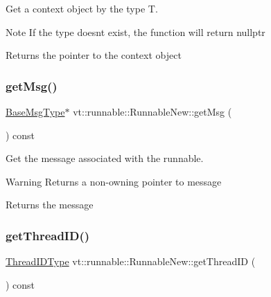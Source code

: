 Get a context object by the type {\ttfamily T}. 

\begin{DoxyNote}{Note}
If the type doesn\textquotesingle{}t exist, the function will return {\ttfamily nullptr} 
\end{DoxyNote}
\begin{DoxyReturn}{Returns}
the pointer to the context object 
\end{DoxyReturn}
\mbox{\label{structvt_1_1runnable_1_1_runnable_new_aed655dff826a821a3db9162259f33288}} 
\subsubsection{\texorpdfstring{get\+Msg()}{getMsg()}}
{\footnotesize\ttfamily \hyperlink{namespacevt_a44d0d4e144748f2b19a1cfd962f50338}{Base\+Msg\+Type}$\ast$ vt\+::runnable\+::\+Runnable\+New\+::get\+Msg (\begin{DoxyParamCaption}{ }\end{DoxyParamCaption}) const\hspace{0.3cm}{\ttfamily [inline]}}



Get the message associated with the runnable. 

\begin{DoxyWarning}{Warning}
Returns a non-\/owning pointer to message
\end{DoxyWarning}
\begin{DoxyReturn}{Returns}
the message 
\end{DoxyReturn}
\mbox{\label{structvt_1_1runnable_1_1_runnable_new_a42ab8351e2003e8810711ef020a72931}} 
\subsubsection{\texorpdfstring{get\+Thread\+I\+D()}{getThreadID()}}
{\footnotesize\ttfamily \hyperlink{namespacevt_a9b887d814dd25ff495a0c8270304ac02}{Thread\+I\+D\+Type} vt\+::runnable\+::\+Runnable\+New\+::get\+Thread\+ID (\begin{DoxyParamCaption}{ }\end{DoxyParamCaption}) const\hspace{0.3cm}{\ttfamily [inline]}}



